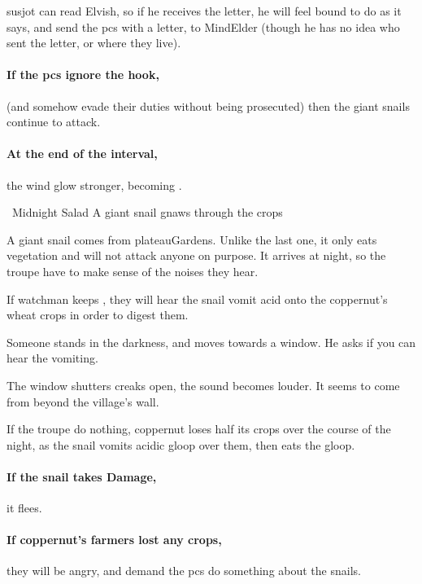 \Gls{susjot} can read Elvish, so if he receives the letter, he will feel bound to do as it says, and send the \glspl{pc} with a letter, to \gls{MindElder} (though he has no idea who sent the letter, or where they live).

\paragraph{If the \glspl{pc} ignore the hook,}
(and somehow evade their duties without being prosecuted) then the giant snails continue to attack.

\paragraph{At the end of the \gls{interval},}
the wind glow stronger, becoming .

{~Midnight Salad}%
{A giant snail gnaws through the crops}%

A giant snail comes from \gls{plateauGardens}.
Unlike the last one, it only eats vegetation and will not attack anyone on purpose.
It arrives at night, so the troupe have to make sense of the noises they hear.

If  watchman keeps , they will hear the snail vomit acid onto the \gls{coppernut}'s wheat crops in order to digest them.

\begin{boxtext}
  Someone stands in the darkness, and moves towards a window.
  He asks if you can hear the vomiting.

  The window shutters creaks open, the sound becomes louder.
  It seems to come from beyond the \gls{village}'s wall.
\end{boxtext}

If the troupe do nothing, \gls{coppernut} loses half its crops over the course of the night, as the snail vomits acidic gloop over them, then eats the gloop.

\paragraph{If the snail takes Damage,}
it flees.

\paragraph{If \gls{coppernut}'s farmers lost any crops,}
they will be angry, and demand the \glspl{pc} do something about the snails.

